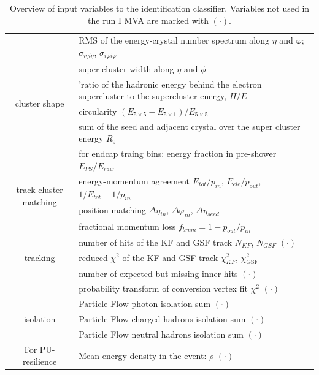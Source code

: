 \begin{table}[h!]
\begin{tabular}{c|l}
\multirow{6}{*}{cluster shape}
	&  RMS of the energy-crystal number spectrum along $\eta$ and $\varphi$; $\sigma_{i\eta i\eta}$, $\sigma_{i\varphi i\varphi}$		\\
	&  super cluster width along $\eta$ and $\phi$		\\
	&  'ratio of the hadronic energy behind the electron 
supercluster to the supercluster energy, $H/E$			\\
	&  circularity $(E_{5\times5} - E_{5\times1})/E_{5\times5}$			\\
	&  sum of the seed and adjacent crystal over the super cluster energy $R_{9}$			\\
	&  for endcap traing bins: energy fraction in pre-shower $E_{PS}/E_{raw}$			\\
\hline
\multirow{2}{*}{track-cluster matching}
	& energy-momentum agreement $E_{tot}/p_{in}$, $E_{ele}/p_{out}$, $1/E_{tot} - 1/p_{in}$ 			\\
	& position matching $\Delta\eta_{in}$, $\Delta\varphi_{in}$, $\Delta\eta_{seed}$			\\
\hline
\multirow{5}{*}{tracking}
        & fractional momentum loss $f_{brem} = 1 - p_{out}/p_{in}$	\\
        & number of hits of the KF and GSF track $N_{KF}$, $N_{GSF}$ $(\mathord{\cdot})$ \\
        & reduced $\chi^2$ of the KF and GSF track $\chi^{2}_{KF}$, $\chi^{2}_{\textrm{GSF}}$ \\
        & number of expected but missing inner hits $(\mathord{\cdot})$ 	\\
        & probability transform of conversion vertex fit $\chi^2$ $(\mathord{\cdot})$ \\
\hline
\multirow{3}{*}{isolation}
& Particle Flow photon isolation sum $(\mathord{\cdot})$ \\
& Particle Flow charged hadrons isolation sum $(\mathord{\cdot})$ \\
& Particle Flow neutral hadrons isolation sum $(\mathord{\cdot})$ \\
\hline
\multirow{1}{*}{For PU-resilience}
& Mean energy density in the event: $\rho$ $(\mathord{\cdot})$ \\
\hline %
\hline %
     \end{tabular}
\small
    \caption{Overview of input variables to the identification classifier. Variables not used in the run I MVA are marked with  $(\mathord{\cdot})$.}
    \label{tab:ele_ID_input_variables}
\end{table}

